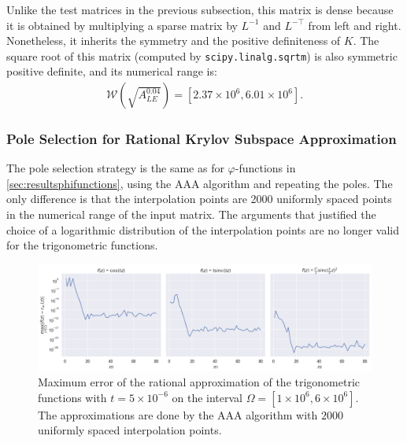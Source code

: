 Unlike the test matrices in the previous subsection, this matrix is dense because
it is obtained by multiplying a sparse matrix by $L^{-1}$ and $L^{-\top}$ from left and
right. Nonetheless, it inherits the symmetry and the positive definiteness of $K$.
The square root of this matrix (computed by \texttt{scipy.linalg.sqrtm}) is also symmetric
positive definite, and its numerical range is:
\begin{gather*}
    \mathcal{W}\left(\sqrt{A_{LE}^{0.04}}\right) = [2.37 \times 10^{6}, 6.01 \times 10^{6}].
\end{gather*}

\subsubsection*{Pole Selection for Rational Krylov Subspace Approximation}
The pole selection strategy is the same as for $\varphi$-functions in \autoref{sec:resultsphifunctions},
using the AAA algorithm and repeating the poles.
The only difference is that the interpolation points are 2000 uniformly spaced points in the
numerical range of the input matrix. The arguments that justified the choice of a logarithmic
distribution of the interpolation points are no longer valid for the trigonometric functions.

\begin{figure}[h]
    \centering
    \includegraphics[width=.9\textwidth]{img/trigonometric/AAA_errors_t5e-06.png}
    \caption{
        Maximum error of the rational approximation of the trigonometric functions
        with $t=5\times10^{-6}$ on the interval $\Omega = [1 \times 10^{6}, 6 \times 10^{6}]$.
        The approximations are done by the AAA algorithm with $2000$ uniformly spaced
        interpolation points.
    }
    \label{fig:trigonometricAAAerrors}
\end{figure}

